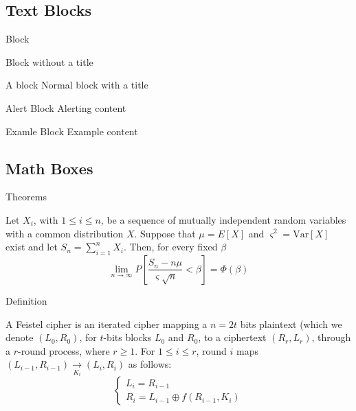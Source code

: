 \documentclass[aspectratio=169,envcountsect]{beamer}    %
\begin{document}
\subsection{Text Blocks}
\begin{frame}{Block}
	\begin{block}{}
		Block without a title
	\end{block}
	\begin{block}{A block}
		Normal block with a title
	\end{block}
	\begin{alertblock}{Alert Block}
		Alerting content
	\end{alertblock}
	\begin{exampleblock}{Examle Block}
		Example content
	\end{exampleblock}
\end{frame}

\subsection{Math Boxes}
\begin{frame}{Theorems}
	\begin{theorem}
		Let $X_{i}$, with $1 \leq i \leq n$, be a sequence of mutually independent random variables with a common distribution $X$. Suppose that $\mu = E[X]$ and $\varsigma^2=\text{Var}[X]$ exist and let $S_n = \sum_{i=1}^n X_i$. Then, for every fixed $\beta$
		\[
			\lim_{n\to\infty} P\left[\frac{S_n - n\mu}{\varsigma\sqrt{n}} < \beta \right] = \Phi(\beta)
		\]
	\end{theorem}
\end{frame}

\begin{frame}{Definition}
	\begin{definition}
		A Feistel cipher is an iterated cipher mapping a $n = 2t$ bits plaintext (which we denote $(L_0,R_0)$, for $t$-bits blocks $L_0$ and $R_0$, to a ciphertext $(R_r,L_r)$, through a $r$-round process, where $r\geq 1$. For $1 \leq i \leq r$, round $i$ maps $(L_{i-1},R_{i-1}) \underset{K_i}{\rightarrow} (L_i,R_i)$ as follows:
		\[
			\left\{\begin{array}{l}
				L_i = R_{i-1}\\
				R_i = L_{i-1} \oplus f(R_{i-1},K_i)
			\end{array}\right.
		\]
	\end{definition}
\end{frame}
\end{document}

